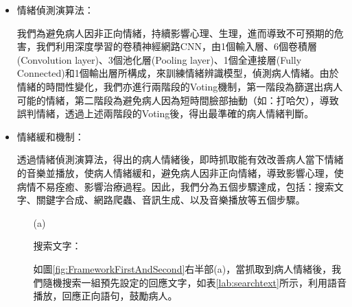 \documentclass[12pt]{scrreprt}
\begin{document}
\begin{itemize}
\item{\begin{bfseries}{情緒偵測演算法：}\end{bfseries}}

我們為避免病人因非正向情緒，持續影響心理、生理，進而導致不可預期的危害，我們利用深度學習的卷積神經網路CNN，由1個輸入層、6個卷積層(Convolution layer)、3個池化層(Pooling layer)、1個全連接層(Fully Connected)和1個輸出層所構成，來訓練情緒辨識模型，偵測病人情緒。由於情緒的時間性變化，我們亦進行兩階段的Voting機制，第一階段為篩選出病人可能的情緒，第二階段為避免病人因為短時間臉部抽動（如：打哈欠），導致誤判情緒，透過上述兩階段的Voting後，得出最準確的病人情緒判斷。\\

\item{\begin{bfseries}{情緒緩和機制：}\end{bfseries}}

透過情緒偵測演算法，得出的病人情緒後，即時抓取能有效改善病人當下情緒的音樂並播放，使病人情緒緩和，避免病人因非正向情緒，導致影響心理，使病情不易痊癒、影響治療過程。因此，我們分為五個步驟達成，包括：搜索文字、關鍵字合成、網路爬蟲、音訊生成、以及音樂播放等五個步驟。
\begin{itemize}
\item[(a)]{\begin{bfseries}{搜索文字：}\end{bfseries}}

如圖\ref{fig:FrameworkFirstAndSecond}右半部(a)，當抓取到病人情緒後，我們隨機搜索一組預先設定的回應文字，如表\ref{lab:searchtext}所示，利用語音播放，回應正向語句，鼓勵病人。\\

\renewcommand{\arraystretch}{1.0} 
\renewcommand{\multirowsetup}{\centering}


\end{itemize}
\end{itemize}
\end{document}
